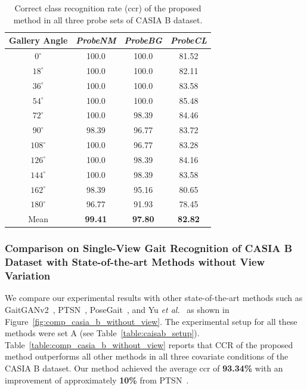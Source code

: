 \begin{table}[t]
	\centering
	\caption [Correct class recognition rate (CCR) of the proposed method in all three probe sets of CASIA B dataset]
	{Correct class recognition rate (\gls{ccr}) of the proposed method in all three probe sets of CASIA B dataset. \label{table:resutl_without_view}}
	
	{\begin{tabular*}{22pc}{cccc}\hline
	Gallery Angle  &\textit{ProbeNM}  &\textit{ProbeBG} &\textit{ProbeCL} \\\hline\noalign{\smallskip} 
	${0^{\circ}}$	&100.0  &100.0  &81.52  \\\noalign{\smallskip}
	${18^{\circ}}$  &100.0  &100.0  &82.11  \\\noalign{\smallskip}
	${36^{\circ}}$	&100.0  &100.0  &83.58  \\\noalign{\smallskip}
	${54^{\circ}}$	&100.0  &100.0  &85.48  \\\noalign{\smallskip}
	${72^{\circ}}$	&100.0  &98.39 &84.46   \\\noalign{\smallskip}
	${90^{\circ}}$	&98.39  &96.77  &83.72  \\\noalign{\smallskip} 
	${108^{\circ}}$ &100.0  &96.77  &83.28  \\\noalign{\smallskip}
	${126^{\circ}}$ &100.0  &98.39  &84.16  \\\noalign{\smallskip}
	${144^{\circ}}$ &100.0  &98.39  &83.58  \\\noalign{\smallskip}
	${162^{\circ}}$	&98.39  &95.16  &80.65 \\\noalign{\smallskip}
	${180^{\circ}}$ &96.77  &91.93  &78.45  \\\noalign{\smallskip}
	Mean &\textbf{99.41}  &\textbf{97.80}  &\textbf{82.82} \\\hline
	\end{tabular*}}{}
\end{table}



\subsubsection{Comparison on Single-View Gait Recognition of CASIA B Dataset with State-of-the-art Methods without View Variation}
We compare our experimental results with other state-of-the-art methods such as GaitGANv2~\cite{Yu_19}, PTSN~\cite{Liao_17}, PoseGait~\cite{Liao_19}, and Yu \textit{et al.}~\cite{Yu_17_spae} as shown in Figure~\ref{fig:comp_casia_b_without_view}. The experimental setup for all these methods were set A (see Table~\ref{table:caisab_setup}). Table~\ref{table:comp_casia_b_without_view} reports that CCR of the proposed method outperforms all other methods in all three covariate conditions of the CASIA B dataset. Our method achieved the average \gls{ccr} of \textbf{93.34\%} with an improvement of approximately \textbf{10\%} from PTSN~\cite{Liao_17}.


